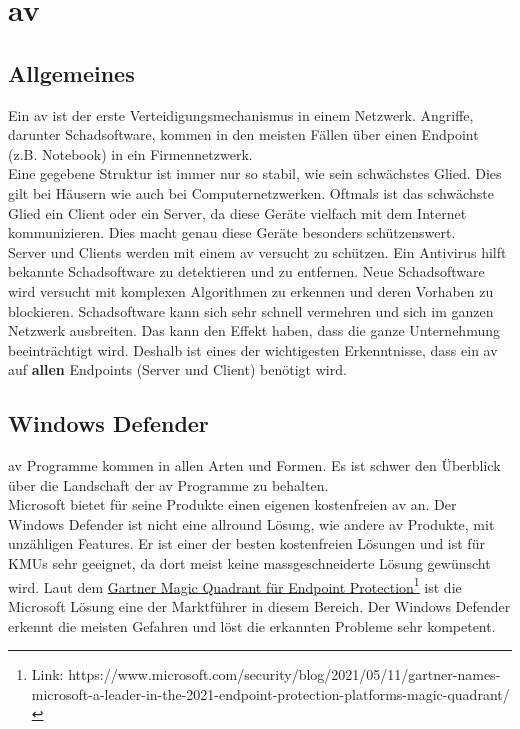 \chapter{\acrlong{av}}
\section{Allgemeines}
Ein \acrfull{av} ist der erste Verteidigungsmechanismus in einem Netzwerk. Angriffe, darunter Schadsoftware, kommen in den meisten Fällen über einen Endpoint (z.B. Notebook) in ein Firmennetzwerk.\\

Eine gegebene Struktur ist immer nur so stabil, wie sein schwächstes Glied. Dies gilt bei Häusern wie auch bei Computernetzwerken.
Oftmals ist das schwächste Glied ein Client oder ein Server, da diese Geräte vielfach mit dem Internet kommunizieren.
Dies macht genau diese Geräte besonders schützenswert.\\

Server und Clients werden mit einem \acrlong{av} versucht zu schützen. Ein Antivirus hilft bekannte Schadsoftware zu detektieren und zu entfernen.
Neue Schadsoftware wird versucht mit komplexen Algorithmen zu erkennen und deren Vorhaben zu blockieren.
Schadsoftware kann sich sehr schnell vermehren und sich im ganzen Netzwerk ausbreiten. 
Das kann den Effekt haben, dass die ganze Unternehmung beeinträchtigt wird.
Deshalb ist eines der wichtigesten Erkenntnisse, dass ein \acrlong{av} auf \textbf{allen} Endpoints (Server und Client) benötigt wird.





\section{Windows Defender}
\acrfull{av} Programme kommen in allen Arten und Formen.
Es ist schwer den Überblick über die Landschaft der \acrlong{av} Programme zu behalten.\\


Microsoft bietet für seine Produkte einen eigenen kostenfreien \acrlong{av} an.
Der Windows Defender ist nicht eine allround Lösung, wie andere \acrshort{av} Produkte, mit unzähligen Features.
Er ist einer der besten kostenfreien Lösungen und ist für KMUs sehr geeignet, da dort meist keine massgeschneiderte Lösung gewünscht wird.
Laut dem \href{https://www.microsoft.com/security/blog/2021/05/11/gartner-names-microsoft-a-leader-in-the-2021-endpoint-protection-platforms-magic-quadrant/}{Gartner Magic Quadrant für Endpoint Protection}\footnote{Link: https://www.microsoft.com/security/blog/2021/05/11/gartner-names-microsoft-a-leader-in-the-2021-endpoint-protection-platforms-magic-quadrant/} ist die Microsoft Lösung eine der Marktführer in diesem Bereich.
Der Windows Defender erkennt die meisten Gefahren und löst die erkannten Probleme sehr kompetent.\\

